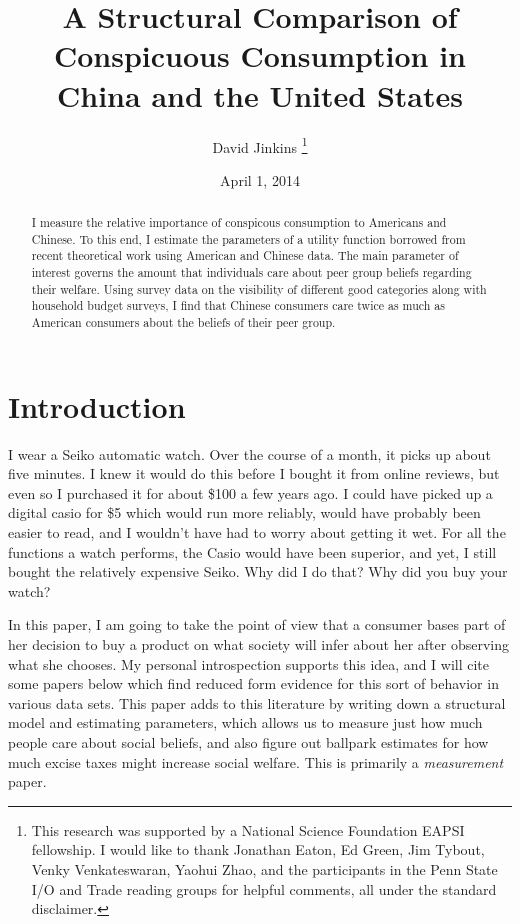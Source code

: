 \documentclass[12pt]{article}
\title{A Structural Comparison of Conspicuous Consumption in China and the United States
}
\author{David Jinkins
    \thanks{This research was supported by a National Science Foundation EAPSI fellowship.  I would like to thank Jonathan Eaton, Ed Green, Jim Tybout, Venky Venkateswaran, Yaohui Zhao, and the participants in the Penn State I/O and Trade reading groups for helpful comments, all under the standard disclaimer.}
}
\date{April 1, 2014}
\begin{document}
\maketitle

\begin{abstract}
    I measure the relative importance of conspicous consumption to Americans and Chinese.  To this end, I estimate the parameters of a utility function borrowed from recent theoretical work using American and Chinese data.  The main parameter of interest governs the amount that individuals care about peer group beliefs regarding their welfare.  Using survey data on the visibility of different good categories along with household budget surveys, I find that Chinese consumers care twice as much as American consumers about the beliefs of their peer group.
\end{abstract}

\section{Introduction}

I wear a Seiko automatic watch.  Over the course of a month, it picks up about five minutes.  I knew it would do this before I bought it from online reviews, but even so I purchased it for about \$100 a few years ago.  I could have picked up a digital casio for \$5 which would run more reliably, would have probably been easier to read, and I wouldn't have had to worry about getting it wet.  For all the functions a watch performs, the Casio would have been superior, and yet, I still bought the relatively expensive Seiko.  Why did I do that?  Why did you buy your watch?

In this paper, I am going to take the point of view that a consumer bases part of her decision to buy a product on what society will infer about her after observing what she chooses.  
My personal introspection supports this idea, and I will cite some papers below which find reduced form evidence for this sort of behavior in various data sets. This paper adds to this literature by writing down a structural model and estimating parameters, which allows us to measure just how much people care about social beliefs, and also figure out ballpark estimates for how much excise taxes might increase social welfare. This is primarily a \emph{measurement} paper.
\end{document}
